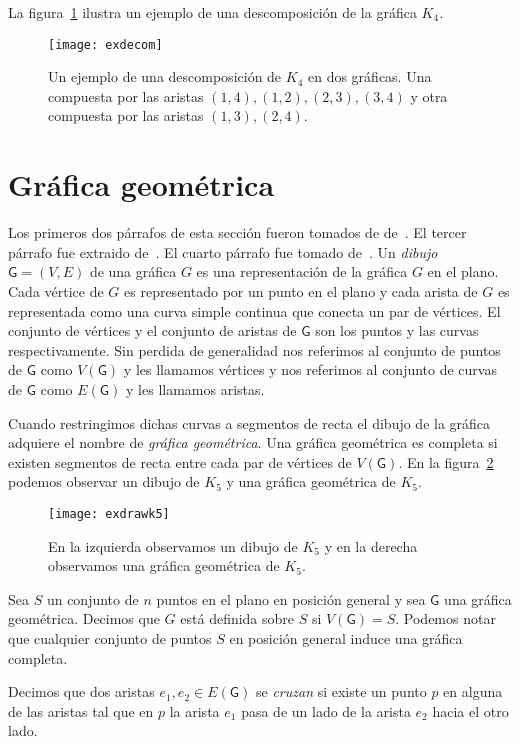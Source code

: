 La figura~\ref{fig:exdecom} ilustra un ejemplo de una descomposición de la gráfica $K_4$.
\begin{figure}[htbp]
  \centering
  \texttt{[image: exdecom]}
  \caption{Un ejemplo de una descomposición de $K_4$ en dos gráficas. Una
  compuesta por las aristas $(1,4),(1,2),(2,3),(3,4)$ y otra compuesta por las aristas $(1,3),(2,4)$.}
  \label{fig:exdecom}
\end{figure}
\section{Gráfica geométrica}
Los primeros dos párrafos de esta sección fueron tomados de de~\cite{Pach2013}. El tercer párrafo
fue extraido de~\cite{Lara2019}. El cuarto párrafo fue tomado de~\cite{Pach2011}.
Un \emph{dibujo} $\mathsf{G}=(V,E)$ de una gráfica $G$ es una representación de la
gráfica $G$ en el plano. Cada vértice de $G$ es representado por un punto en el plano
y cada arista de $G$ es representada como una curva simple continua que conecta un par de vértices.
El conjunto de vértices y el conjunto de aristas de $\mathsf{G}$
son los puntos y las curvas respectivamente. Sin perdida de generalidad nos referimos al
conjunto de puntos de $\mathsf{G}$ como $V(\mathsf{G})$ y les llamamos vértices y nos
referimos al conjunto de curvas de $\mathsf{G}$ como $E(\mathsf{G})$ y les llamamos aristas.

Cuando restringimos dichas curvas a segmentos de recta el dibujo de la gráfica
adquiere el nombre de \emph{gráfica geométrica}. Una gráfica
geométrica es completa si existen segmentos de recta entre cada par de vértices
de $V(\mathsf{G})$. En la figura~\ref{fig:exdrawk5} podemos observar un dibujo de $K_5$ y una
gráfica geométrica de $K_5$.
\begin{figure}[htpb]
  \centering
  \texttt{[image: exdrawk5]}
  \caption{En la izquierda observamos un dibujo de $K_5$ y en la derecha observamos
  una gráfica geométrica de $K_5$.}
  \label{fig:exdrawk5}
\end{figure}

Sea $S$ un conjunto de $n$ puntos en el plano en posición general y sea $\mathsf{G}$
una gráfica geométrica. Decimos que $G$ está definida sobre $S$ si $V(\mathsf{G}) = S$.
Podemos notar que cualquier conjunto de puntos $S$ en posición
general induce una gráfica completa.

Decimos que dos aristas $e_1,e_2 \in E(\mathsf{G})$ se \emph{cruzan} si existe un punto $p$
en alguna de las aristas tal que en $p$ la arista $e_1$ pasa de un lado de la arista
$e_2$ hacia el otro lado.


